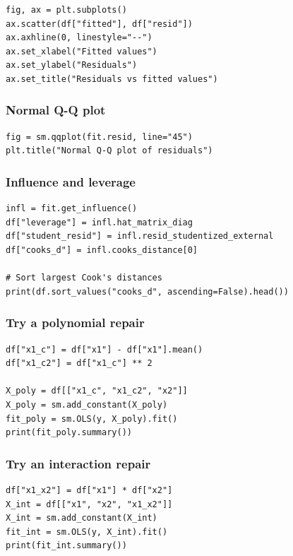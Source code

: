 \begin{verbatim}
fig, ax = plt.subplots()
ax.scatter(df["fitted"], df["resid"])
ax.axhline(0, linestyle="--")
ax.set_xlabel("Fitted values")
ax.set_ylabel("Residuals")
ax.set_title("Residuals vs fitted values")
\end{verbatim}

\subsubsection*{Normal Q-Q plot}

\begin{verbatim}
fig = sm.qqplot(fit.resid, line="45")
plt.title("Normal Q-Q plot of residuals")
\end{verbatim}

\subsubsection*{Influence and leverage}

\begin{verbatim}
infl = fit.get_influence()
df["leverage"] = infl.hat_matrix_diag
df["student_resid"] = infl.resid_studentized_external
df["cooks_d"] = infl.cooks_distance[0]

# Sort largest Cook's distances
print(df.sort_values("cooks_d", ascending=False).head())
\end{verbatim}

\subsubsection*{Try a polynomial repair}

\begin{verbatim}
df["x1_c"] = df["x1"] - df["x1"].mean()
df["x1_c2"] = df["x1_c"] ** 2

X_poly = df[["x1_c", "x1_c2", "x2"]]
X_poly = sm.add_constant(X_poly)
fit_poly = sm.OLS(y, X_poly).fit()
print(fit_poly.summary())
\end{verbatim}

\subsubsection*{Try an interaction repair}

\begin{verbatim}
df["x1_x2"] = df["x1"] * df["x2"]
X_int = df[["x1", "x2", "x1_x2"]]
X_int = sm.add_constant(X_int)
fit_int = sm.OLS(y, X_int).fit()
print(fit_int.summary())
\end{verbatim}

